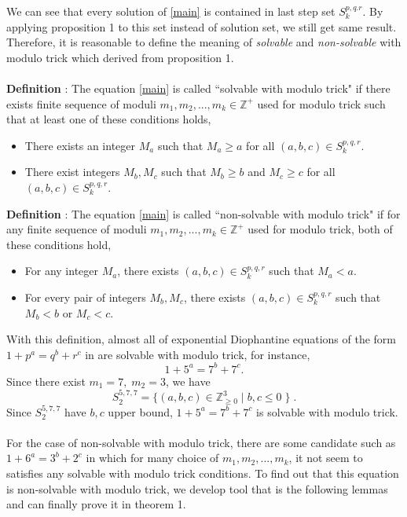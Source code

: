 \documentclass[12pt]{article}
\begin{document}
\hspace*{0.5cm} We can see that every solution of \eqref{main} is contained in last step set $S^{p,q.r}_k$. By applying proposition 1 to this set instead of solution set, we still get same result. Therefore, it is reasonable to define the meaning of \textit{solvable} and \textit{non-solvable} with modulo trick which derived  from proposition 1.\\\\ 
\textbf{Definition} : The equation \eqref{main} is called ``solvable with modulo trick" if there exists finite sequence of moduli $m_1,m_2,...,m_k \in \mathbb{Z}^{+}$ used for modulo trick such that at least one of these conditions holds,
\begin{itemize}
    \item There exists an integer $M_a$ such that $M_a \geq a$ for all $(a,b,c) \in S^{p,q,r}_k$.
    \item There exist integers $M_b,M_c$ such that $M_b \geq b$ and  $M_c \geq c$  for all $(a,b,c) \in S^{p,q,r}_k$.
\end{itemize}
\textbf{Definition} : The equation \eqref{main} is called ``non-solvable with modulo trick" if for any finite sequence of moduli $m_1,m_2,...,m_k \in \mathbb{Z}^{+}$ used for modulo trick, both of these conditions hold,
\begin{itemize}
    \item For any integer $M_a$, there exists $(a,b,c) \in S^{p,q,r}_{k}$ such that $M_a < a$.
    \item For every pair of integers $M_b,M_c$, there exists $(a,b,c) \in S^{p,q,r}_{k}$ such that $M_b < b$ or $M_c < c$.
\end{itemize}
\hspace{0.5cm} With this definition, almost all of exponential Diophantine equations of the form $1+p^a = q^b + r^c$ in \cite{eDe} are solvable with modulo trick, for instance, \\
\[1+5^a = 7^b + 7^c.\]
Since there exist $m_1 = 7, \;m_2=3$, we have
\[S_2^{5,7,7} = \{ (a,b,c)\in \mathbb{Z}_{\geq0}^3 \; |\; b,c \leq 0\; \}\; .\] 
Since $S_2^{5,7,7}$ have $b,c$ upper bound, $1+5^a  = 7^b +7^c $ is solvable with modulo trick.\\\\
\hspace*{0.5cm}For the case of non-solvable with modulo trick, there are some candidate such as $1+6^a = 3^b + 2^c$ in which for many choice of $m_1, m_2,...,m_k$, it not seem to satisfies any solvable with modulo trick conditions. To find out that this equation is non-solvable with modulo trick, we develop tool that is the following lemmas and can finally prove it in theorem 1.\\\\
\end{document}
